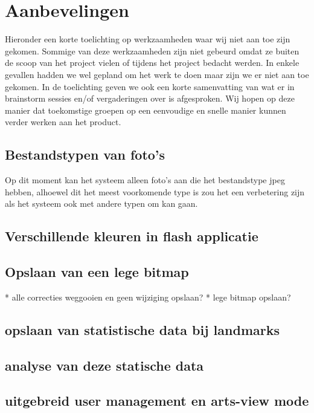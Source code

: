 \section{Aanbevelingen}
\label{Aanbevelingen}
Hieronder een korte toelichting op werkzaamheden waar wij niet aan toe zijn gekomen. Sommige van deze werkzaamheden zijn niet gebeurd omdat ze buiten de scoop van het project vielen of tijdens het project bedacht werden. In enkele gevallen hadden we wel gepland om het werk te doen maar zijn we er niet aan toe gekomen.  In de toelichting geven we ook een korte samenvatting van wat er in brainstorm sessies en/of vergaderingen over is afgesproken. Wij hopen op deze manier dat toekomstige groepen op een eenvoudige en snelle manier kunnen verder werken aan het product.

\subsection{Bestandstypen van foto's}
Op dit moment kan het systeem alleen foto's aan die het bestandstype jpeg hebben, alhoewel dit het meest voorkomende type is zou het een verbetering zijn als het systeem ook met andere typen om kan gaan.

\subsection{Verschillende kleuren in flash applicatie}

\subsection{Opslaan van een lege bitmap}
* alle correcties weggooien en geen wijziging opslaan?
* lege bitmap opslaan?

\subsection{opslaan van statistische data bij landmarks}

\subsection{analyse van deze statische data}

\subsection{uitgebreid user management en arts-view mode}

